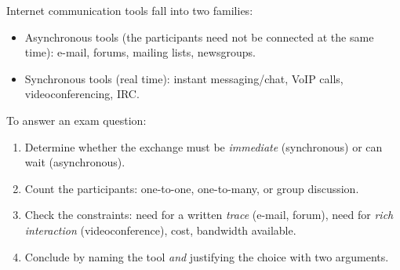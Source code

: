 \documentclass[11pt]{article}
\newcommand{\cle}[1]{{\popxbold\color{popdark}#1}}
\begin{document}
\begin{methode}
Internet communication tools fall into two families:
\begin{itemize}
\item \cle{Asynchronous} tools (the participants need not be connected at the same time): e-mail, forums, mailing lists, newsgroups.
\item \cle{Synchronous} tools (real time): instant messaging/chat, VoIP calls, videoconferencing, IRC.
\end{itemize}
To answer an exam question:
\begin{enumerate}
\item Determine whether the exchange must be \emph{immediate} (synchronous) or can wait (asynchronous).
\item Count the participants: one-to-one, one-to-many, or group discussion.
\item Check the constraints: need for a written \emph{trace} (e-mail, forum), need for \emph{rich interaction} (videoconference), cost, bandwidth available.
\item Conclude by naming the tool \emph{and} justifying the choice with two arguments.
\end{enumerate}
\end{methode}
\end{document}
